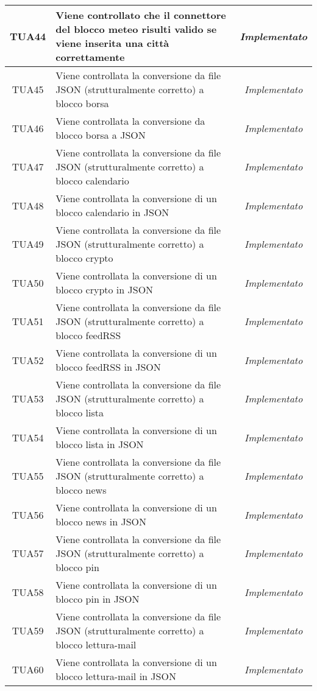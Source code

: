 \begin{longtable}{|c|m{12em}|c|}
TUA44 &  Viene controllato che il connettore del blocco meteo risulti valido se viene inserita una città correttamente& \textit{Implementato}\\ \hline
TUA45 & Viene controllata la conversione da file JSON (strutturalmente corretto) a blocco borsa & \textit{Implementato}\\ \hline
TUA46 & Viene controllata la conversione da blocco borsa a JSON& \textit{Implementato}\\ \hline
TUA47 & Viene controllata la conversione da file JSON (strutturalmente corretto) a blocco calendario & \textit{Implementato}\\ \hline
TUA48 & Viene controllata la conversione di un blocco calendario in JSON  & \textit{Implementato}\\ \hline
TUA49 & Viene controllata la conversione da file JSON (strutturalmente corretto) a blocco crypto& \textit{Implementato}\\ \hline
TUA50 & Viene controllata la conversione di un blocco crypto in JSON& \textit{Implementato}\\ \hline
TUA51 & Viene controllata la conversione da file JSON (strutturalmente corretto) a blocco feedRSS& \textit{Implementato}\\ \hline
TUA52 & Viene controllata la conversione di un blocco feedRSS in JSON&  \textit{Implementato}\\ \hline
TUA53 & Viene controllata la conversione da file JSON (strutturalmente corretto) a blocco lista& \textit{Implementato}\\ \hline
TUA54 & Viene controllata la conversione di un blocco lista in JSON& \textit{Implementato}\\ \hline
TUA55 & Viene controllata la conversione da file JSON (strutturalmente corretto) a blocco news& \textit{Implementato}\\ \hline
TUA56 & Viene controllata la conversione di un blocco news in JSON& \textit{Implementato}\\ \hline
TUA57 & Viene controllata la conversione da file JSON (strutturalmente corretto) a blocco pin & \textit{Implementato}\\ \hline
TUA58 & Viene controllata la conversione di un blocco pin in JSON& \textit{Implementato}\\ \hline
TUA59 & Viene controllata la conversione da file JSON (strutturalmente corretto) a blocco lettura-mail& \textit{Implementato}\\ \hline
TUA60 & Viene controllata la conversione di un blocco lettura-mail in JSON& \textit{Implementato}\\ \hline

\end{longtable}
